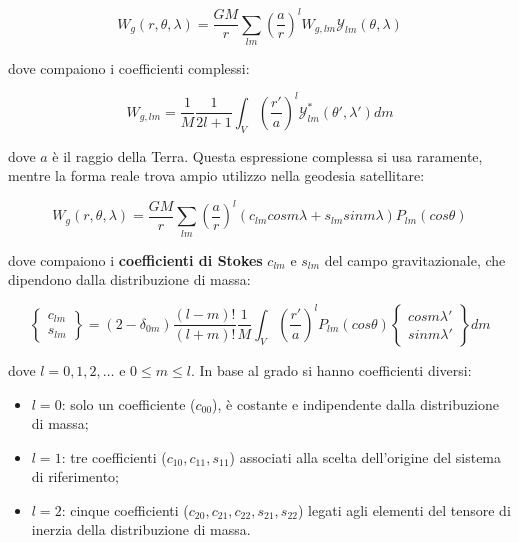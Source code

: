 \documentclass[a4paper,12pt]{book}
\begin{document}
\begin{equation}
    W_g (r, \theta, \lambda) = \frac{GM}{r} \sum_{lm} \left( \frac{a}{r} \right) ^l W_{g,lm} \mathcal{Y}_{lm} (\theta, \lambda)
\end{equation}

\noindent
dove compaiono i coefficienti complessi:

\begin{equation}
     W_{g,lm} = \frac{1}{M} \frac{1}{2l+1} \int_V \left( \frac{r'}{a} \right) ^l \mathcal{Y}^*_{lm} (\theta', \lambda') dm
\end{equation}

\noindent
dove $a$ è il raggio della Terra.
Questa espressione complessa si usa raramente, mentre la forma reale trova ampio utilizzo nella geodesia satellitare:

\begin{equation}
    W_g (r, \theta, \lambda) = \frac{GM}{r} \sum_{lm} \left( \frac{a}{r} \right) ^l (c_{lm} cos m\lambda + s_{lm} sin m\lambda) P_{lm}(cos \theta)
\end{equation}

\noindent
dove compaiono i \textbf{coefficienti di Stokes} $c_{lm}$ e $s_{lm}$ del campo gravitazionale, che dipendono dalla distribuzione di massa:

\begin{equation}
    \left\{ \begin{matrix}
        c_{lm} \\ s_{lm}
    \end{matrix}\right\} = (2-\delta_{0m}) \frac{(l-m)!}{(l+m)!} \frac{1}{M} \int_V \left( \frac{r'}{a} \right)^l P_{lm} (cos \theta) \left\{ \begin{matrix}
        cos m\lambda' \\ sin m\lambda'
    \end{matrix}\right\} dm
\end{equation}

\noindent
dove $l=0,1,2,\dots$ e $0 \leq m \leq l$. In base al grado si hanno coefficienti diversi: 

\begin{itemize}
    \item $l=0$: solo un coefficiente ($c_{00}$), è costante e indipendente dalla distribuzione di massa;
    \item $l=1$: tre coefficienti ($c_{10}, c_{11}, s_{11}$) associati alla scelta dell'origine del sistema di riferimento;
    \item $l=2$: cinque coefficienti ($c_{20}, c_{21}, c_{22}, s_{21}, s_{22}$) legati agli elementi del tensore di inerzia della distribuzione di massa.
\end{itemize}
\end{document}
